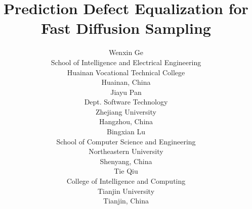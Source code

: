 \documentclass{article}
\title{Prediction Defect Equalization for Fast Diffusion Sampling}
\author{%
Wenxin Ge\\
School of Intelligence and Electrical Engineering\\
Huainan Vocational Technical College\\
Huainan, China\\
\And
Jiayu Pan\\
Dept. Software Technology\\
Zhejiang University\\
Hangzhou, China\\
\And
Bingxian Lu\\
School of Computer Science and Engineering\\
Northeastern University\\
Shenyang, China\\
\And
Tie Qiu\\
College of Intelligence and Computing\\
Tianjin University\\
Tianjin, China\\
}
\begin{document}
\maketitle

\begin{abstract}

\end{abstract}












\appendix









\newpage

\end{document}
